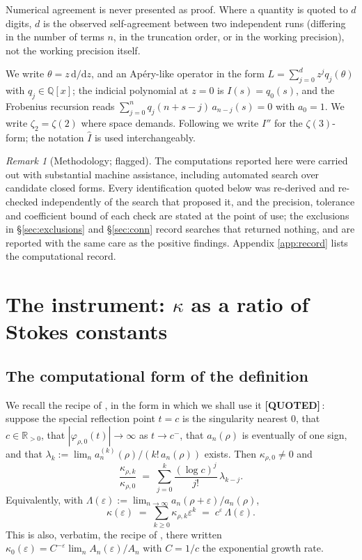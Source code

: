 \documentclass[11pt,reqno]{amsart}
\theoremstyle{plain}
\theoremstyle{definition}
\theoremstyle{remark}
\newtheorem{remark}[theorem]{Remark}
\newcommand{\QUOTEDMARK}{{\normalfont\sffamily\bfseries[QUOTED]}}
\newcommand{\QUOTED}[1]{\QUOTEDMARK\,#1}
\newcommand{\QQ}{\mathbb{Q}}
\newcommand{\RR}{\mathbb{R}}
\newcommand{\dd}{\mathrm{d}}
\newcommand{\eps}{\varepsilon}
\newcommand{\Ihat}{\widehat{I}}
\begin{document}
Numerical agreement is never presented as proof. Where a quantity is quoted to $d$ digits, $d$
is the observed self-agreement between two independent runs (differing in the number of terms
$n$, in the truncation order, or in the working precision), not the working precision itself.

We write $\theta=z\,\dd/\dd z$, and an Ap\'ery-like operator in the form
$L=\sum_{j=0}^{d}z^{j}q_j(\theta)$ with $q_j\in\QQ[x]$; the indicial polynomial at $z=0$ is
$I(s)=q_0(s)$, and the Frobenius recursion reads
$\sum_{j=0}^{n}q_j(n+s-j)\,a_{n-j}(s)=0$ with $a_0=1$. We write $\zeta_2=\zeta(2)$ where space
demands. Following \cite{BZ} we write $I''$ for the $\zeta(3)$-form; the notation $\Ihat$ is
used interchangeably.

\begin{remark}[Methodology; flagged]\label{rem:method}
The computations reported here were carried out with substantial machine assistance, including
automated search over candidate closed forms. Every identification quoted below was re-derived
and re-checked independently of the search that proposed it, and the precision, tolerance and
coefficient bound of each check are stated at the point of use; the exclusions in
\S\ref{sec:exclusions} and \S\ref{sec:conn} record searches that returned nothing, and are
reported with the same care as the positive findings. Appendix \ref{app:record} lists the
computational record.
\end{remark}

\section{The instrument: \texorpdfstring{$\kappa$}{kappa} as a ratio of Stokes constants}
\label{sec:instrument}

\subsection{The computational form of the definition}
We recall the recipe of \cite[Lemma 24]{BV}, in the form in which we shall use it
\QUOTED{\cite[Lemma 24]{BV}}: suppose the special reflection point $t=c$ is the singularity
nearest $0$, that $c\in\RR_{>0}$, that $|\varphi_{\rho,0}(t)|\to\infty$ as $t\to c^-$, that
$a_n(\rho)$ is eventually of one sign, and that
$\lambda_k:=\lim_n a_n^{(k)}(\rho)/(k!\,a_n(\rho))$ exists. Then $\kappa_{\rho,0}\ne 0$ and
\begin{equation}\label{eq:BVlemma24}
  \frac{\kappa_{\rho,k}}{\kappa_{\rho,0}}\;=\;\sum_{j=0}^{k}\frac{(\log c)^j}{j!}\,\lambda_{k-j}.
\end{equation}
Equivalently, with $\Lambda(\eps):=\lim_{n\to\infty}a_n(\rho+\eps)/a_n(\rho)$,
\begin{equation}\label{eq:kappaLambda}
  \kappa(\eps)\;=\;\sum_{k\ge 0}\kappa_{\rho,k}\eps^k\;=\;c^{\eps}\,\Lambda(\eps).
\end{equation}
This is also, verbatim, the recipe of \cite[\S9]{GZ1}, there written
$\kappa_0(\eps)=C^{-\eps}\lim_n A_n(\eps)/A_n$ with $C=1/c$ the exponential growth rate.
\end{document}
